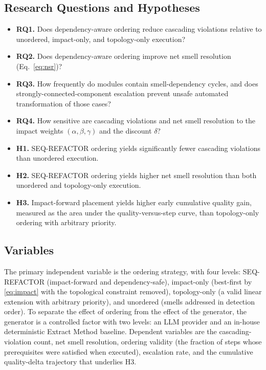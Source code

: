 \documentclass[journal,onecolumn,11pt]{IEEEtran}
\begin{document}
\subsection{Research Questions and Hypotheses}
\begin{itemize}
\item \textbf{RQ1.} Does dependency-aware ordering reduce cascading violations relative to unordered, impact-only, and topology-only execution?
\item \textbf{RQ2.} Does dependency-aware ordering improve net smell resolution (Eq.~\ref{eq:nsr})?
\item \textbf{RQ3.} How frequently do modules contain smell-dependency cycles, and does strongly-connected-component escalation prevent unsafe automated transformation of those cases?
\item \textbf{RQ4.} How sensitive are cascading violations and net smell resolution to the impact weights $(\alpha,\beta,\gamma)$ and the discount $\delta$?
\end{itemize}

\begin{itemize}
\item \textbf{H1.} SEQ-REFACTOR ordering yields significantly fewer cascading violations than unordered execution.
\item \textbf{H2.} SEQ-REFACTOR ordering yields higher net smell resolution than both unordered and topology-only execution.
\item \textbf{H3.} Impact-forward placement yields higher early cumulative quality gain, measured as the area under the quality-versus-step curve, than topology-only ordering with arbitrary priority.
\end{itemize}

\subsection{Variables}
The primary independent variable is the ordering strategy, with four levels: SEQ-REFACTOR (impact-forward and dependency-safe), impact-only (best-first by \eqref{eq:impact} with the topological constraint removed), topology-only (a valid linear extension with arbitrary priority), and unordered (smells addressed in detection order). To separate the effect of ordering from the effect of the generator, the generator is a controlled factor with two levels: an LLM provider and an in-house deterministic Extract Method baseline. Dependent variables are the cascading-violation count, net smell resolution, ordering validity (the fraction of steps whose prerequisites were satisfied when executed), escalation rate, and the cumulative quality-delta trajectory that underlies H3.
\end{document}
